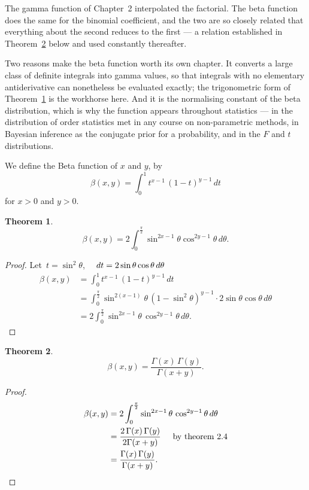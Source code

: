 \documentclass[12pt,a4paper]{report}
\theoremstyle{definition}
\newtheorem{thm}{Theorem}[section]
\theoremstyle{plain}
\begin{document}
The gamma function of Chapter~2 interpolated the factorial. The beta function
does the same for the binomial coefficient, and the two are so closely related
that everything about the second reduces to the first --- a relation established
in Theorem~\ref{thm:betagamma} below and used constantly thereafter.

Two reasons make the beta function worth its own chapter. It converts a large
class of definite integrals into gamma values, so that integrals with no
elementary antiderivative can nonetheless be evaluated exactly; the
trigonometric form of Theorem~\ref{thm:betatrig} is the workhorse here. And it is the
normalising constant of the beta distribution, which is why the function appears
throughout statistics --- in the distribution of order statistics met in any
course on non-parametric methods, in Bayesian inference as the conjugate prior
for a probability, and in the $F$ and $t$ distributions.

We define the Beta function of $x$ and $y$, by $$\beta(x,y) = \int^1_0t^{x-1}\, (1  - t)^{y-1}\, dt$$ for $x>0$ and $y>0$.


\begin{thm}
\label{thm:betatrig}
$$\beta(x,y) = 2\int_0^{\frac{\pi}{2}}\sin^{2x-1}\theta \cos^{2y-1}\theta\, d\theta.$$
\end{thm}
\begin{proof}
Let $\, t = \sin^2\theta$, $\, \hspace{0.3cm} dt = 2\sin\theta\cos\theta\, d\theta$
\begin{align*}
\beta(x,y) & = \int_0^1t^{x-1}\, (1 - t)^{y - 1}\, dt\\
           & = \int_0^{\frac{\pi}{2}}\sin^{2(x-1)}\theta\, (1 - \sin^2\theta)^{y - 1}\cdot 2\sin\theta\cos\theta\, d\theta\\
           & = 2\int_0^{\frac{\pi}{2}}\sin^{2x - 1}\theta\, \cos^{2y - 1}\theta\, d\theta.
\end{align*}
\end{proof}




\begin{thm}
\label{thm:betagamma}
$$\beta(x,y) = \frac{\Gamma(x)\, \Gamma(y)}{\Gamma(x+y)}.$$
\end{thm}

\begin{proof}
\begin{align*}
\beta(x,y) & = 2\int_0^{\frac{\pi}{2}} \sin^{2x - 1}\theta\, \cos^{2y-1}\theta\, d\theta\\
           & = \frac{2\, \Gamma(x)\, \Gamma(y)}{2\Gamma(x+y)}\hspace{0.5cm} \text{by theorem 2.4}\\
           & = \frac{\Gamma(x)\, \Gamma(y)}{\Gamma(x + y)}.
\end{align*}
\end{proof}
\end{document}
